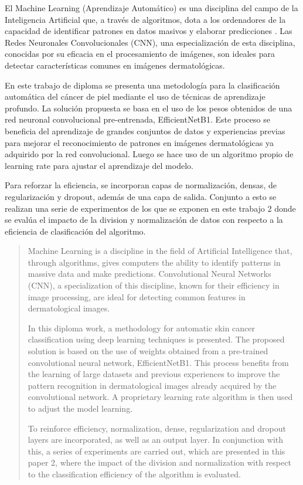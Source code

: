 \begin{resumen}	
	El Machine Learning (Aprendizaje Automático) es una disciplina del campo de la Inteligencia Artificial que, a través de algoritmos, dota a los ordenadores de la capacidad de identificar patrones en datos masivos y elaborar predicciones . Las Redes Neuronales Convolucionales (CNN), una especialización de esta disciplina, conocidas por su eficacia en el procesamiento de imágenes, son ideales para detectar características comunes en imágenes dermatológicas. 
	
	En este trabajo de diploma se presenta una metodología para la clasificación automática del cáncer de piel mediante el uso de técnicas de aprendizaje profundo. La solución propuesta se basa en el uso de los pesos obtenidos de una red neuronal convolucional pre-entrenada, EfficientNetB1. Este proceso se beneficia del aprendizaje de grandes conjuntos de datos y experiencias previas para mejorar el reconocimiento de patrones en imágenes dermatológicas ya adquirido por la red convolucional. Luego se hace uso de un algoritmo propio de learning rate para ajustar el aprendizaje del modelo.

	Para reforzar la eficiencia, se incorporan capas de normalización, densas, de regularización y dropout, además de una capa de salida. Conjunto a esto se realizan una serie de experimentos de los que se exponen en este trabajo 2 donde se evalúa el impacto de la division y normalización de datos con respecto a la eficiencia de clasificación del algoritmo.

\end{resumen}

\begin{abstract}
	Machine Learning is a discipline in the field of Artificial Intelligence that, through algorithms, gives computers the ability to identify patterns in massive data and make predictions. Convolutional Neural Networks (CNN), a specialization of this discipline, known for their efficiency in image processing, are ideal for detecting common features in dermatological images. 
	
	In this diploma work, a methodology for automatic skin cancer classification using deep learning techniques is presented. The proposed solution is based on the use of weights obtained from a pre-trained convolutional neural network, EfficientNetB1. This process benefits from the learning of large datasets and previous experiences to improve the pattern recognition in dermatological images already acquired by the convolutional network. A proprietary learning rate algorithm is then used to adjust the model learning.

	To reinforce efficiency, normalization, dense, regularization and dropout layers are incorporated, as well as an output layer. In conjunction with this, a series of experiments are carried out, which are presented in this paper 2, where the impact of the division and normalization with respect to the classification efficiency of the algorithm is evaluated.
\end{abstract}